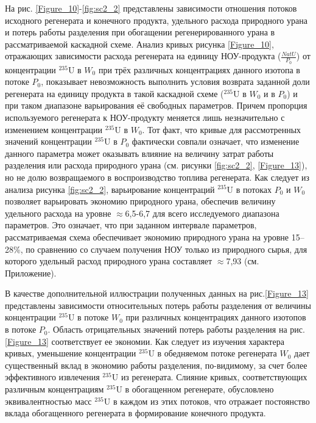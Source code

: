На рис. \ref{Figure_10}-\ref{fig:sc2_2} представлены зависимости отношения потоков исходного регенерата и конечного продукта, удельного расхода природного урана и потерь работы разделения при обогащении регенерированного урана в рассматриваемой каскадной схеме. 
Анализ кривых рисунка \ref{Figure_10}, отражающих зависимости расхода регенерата на единицу НОУ-продукта ($\frac{NatU}{P_{0}}$) от концентрации $^{235}$U в $W_0$ при трёх различных концентрациях данного изотопа в потоке $P_0$, показывает невозможность выполнить условия возврата заданной доли регенерата на единицу продукта в такой каскадной схеме ($^{235}$U в $W_0$ и в $P_0$) и при таком диапазоне варьирования её свободных параметров. Причем пропорция используемого регенерата к НОУ-продукту меняется лишь незначительно с изменением концентрации $^{235}$U в $W_0$. Тот факт, что кривые для рассмотренных значений концентрации $^{235}$U в $P_0$ фактически совпали означает, что изменение данного параметра может оказывать влияние на величину затрат работы разделения или расхода природного урана (см. рисунки \ref{fig:sc2_2}, \ref{Figure_13}), но не долю возвращаемого в воспроизводство топлива регенерата.
Как следует из анализа рисунка \ref{fig:sc2_2}, варьирование концентраций $^{235}$U в потоках $P_0$ и $W_0$ позволяет варьировать экономию природного урана, обеспечив величину удельного расхода на уровне $\approx$6,5-6,7 для всего исследуемого диапазона параметров. Это означает, что при заданном интервале параметров, рассматриваемая схема обеспечивает экономию природного урана на уровне 15--28\%, по сравнению со случаем получения НОУ только из природного сырья, для которого удельный расход природного урана составляет $\approx$7,93 (см. Приложение).

В качестве дополнительной иллюстрации полученных данных на рис.\ref{Figure_13} представлены зависимости относительных потерь работы разделения от величины концентрации $^{235}$U в потоке $W_0$ при различных концентрациях данного изотопов в потоке $P_0$. Область отрицательных значений потерь работы разделения на рис. \ref{Figure_13} соответствует ее экономии. Как следует из изучения характера кривых, уменьшение концентрации $^{235}$U в обедняемом потоке регенерата $W_0$ дает существенный вклад в экономию работы разделения, по-видимому, за счет более эффективного извлечения $^{235}$U из регенерата. Слияние кривых, соответствующих различным концентрациям $^{235}$U в обогащенном регенерате, обусловлено эквивалентностью масс $^{235}$U в каждом из этих потоков, что отражает постоянство вклада обогащенного регенерата в формирование конечного продукта.


